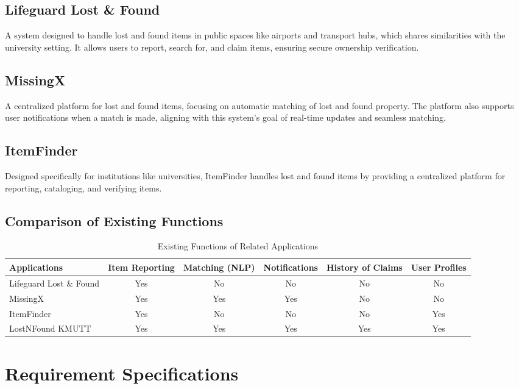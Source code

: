 \subsection{Lifeguard Lost \& Found}
A system designed to handle lost and found items in public spaces like airports and transport hubs, which shares similarities with the university setting. It allows users to report, search for, and claim items, ensuring secure ownership verification.

\subsection{MissingX}
A centralized platform for lost and found items, focusing on automatic matching of lost and found property. The platform also supports user notifications when a match is made, aligning with this system’s goal of real-time updates and seamless matching.

\subsection{ItemFinder}
Designed specifically for institutions like universities, ItemFinder handles lost and found items by providing a centralized platform for reporting, cataloging, and verifying items.

\subsection{Comparison of Existing Functions}
\begin{table}[h!]
\centering
\caption{Existing Functions of Related Applications}
\begin{tabular}{|l|c|c|c|c|c|}
\hline
\textbf{Applications} & \textbf{Item Reporting} & \textbf{Matching (NLP)} & \textbf{Notifications} & \textbf{History of Claims} & \textbf{User Profiles} \\
\hline
Lifeguard Lost \& Found & Yes & No & No & No & No \\
\hline
MissingX & Yes & Yes & Yes & No & No \\
\hline
ItemFinder & Yes & No & No & No & Yes \\
\hline
LostNFound KMUTT & Yes & Yes & Yes & Yes & Yes \\
\hline
\end{tabular}
\end{table}

\section{Requirement Specifications}
